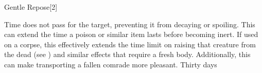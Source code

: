 \begin{spellsection}{Gentle Repose}[2]
    \begin{spellheader}
    \end{spellheader}
    \begin{spellcontent}
        \begin{spelltargetinginfo}
        \end{spelltargetinginfo}
        \begin{spelleffects}

            \spelleffect Time does not pass for the target, preventing it from decaying or spoiling. This can extend the time a poison or similar item lasts before becoming inert. If used on a corpse, this effectively extends the time limit on raising that creature from the dead (see ) and similar effects that require a fresh body. Additionally, this can make transporting a fallen comrade more pleasant.
            \spelldur Thirty days \dismissable
        \end{spelleffects}
    \end{spellcontent}
    \begin{spellfooter}
    \end{spellfooter}
\end{spellsection}

